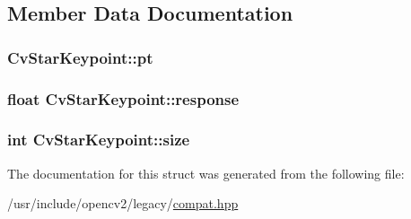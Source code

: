 \subsection{Member Data Documentation}
\hypertarget{structCvStarKeypoint_a11e9bdef9f976cd6efd52f15528202f7}{
\subsubsection[{pt}]{ Cv\-Star\-Keypoint\-::pt}}\label{structCvStarKeypoint_a11e9bdef9f976cd6efd52f15528202f7}
\hypertarget{structCvStarKeypoint_a1f824a700a88dd7f8c0114292626cae0}{
\subsubsection[{response}]{\setlength{\rightskip}{0pt plus 5cm}float Cv\-Star\-Keypoint\-::response}}\label{structCvStarKeypoint_a1f824a700a88dd7f8c0114292626cae0}
\hypertarget{structCvStarKeypoint_a484ba003548660389a9b547618f23a8b}{
\subsubsection[{size}]{\setlength{\rightskip}{0pt plus 5cm}int Cv\-Star\-Keypoint\-::size}}\label{structCvStarKeypoint_a484ba003548660389a9b547618f23a8b}


The documentation for this struct was generated from the following file\-:\begin{DoxyCompactItemize}
\item 
/usr/include/opencv2/legacy/\hyperlink{compat_8hpp}{compat.\-hpp}\end{DoxyCompactItemize}
